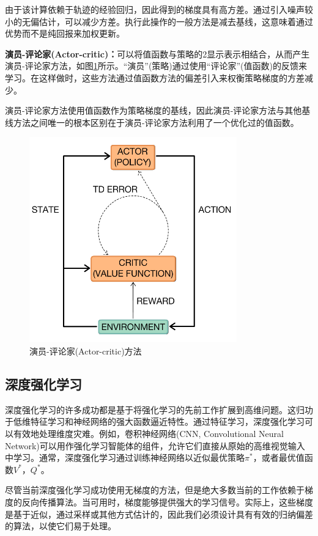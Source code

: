 由于该计算依赖于轨迹的经验回归，因此得到的梯度具有高方差。通过引入噪声较小的无偏估计，可以减少方差。执行此操作的一般方法是减去基线，这意味着通过优势而不是纯回报来加权更新。

\textbf{演员-评论家(Actor-critic)：}可以将值函数与策略的2显示表示相结合，从而产生演员-评论家方法，如图\ref{ac}所示。“演员”(策略)通过使用“评论家”(值函数)的反馈来学习。在这样做时，这些方法通过值函数方法的偏差引入来权衡策略梯度的方差减少\cite{23}\cite{24}。

演员-评论家方法使用值函数作为策略梯度的基线，因此演员-评论家方法与其他基线方法之间唯一的根本区别在于演员-评论家方法利用了一个优化过的值函数。
\begin{figure}[htb]
  \centering
  \includegraphics[width=0.80\textwidth]{figures/ac.png}
  \caption{演员-评论家(Actor-critic)方法}\label{ac}
\end{figure}

\subsection{深度强化学习}
深度强化学习的许多成功都是基于将强化学习的先前工作扩展到高维问题。这归功于低维特征学习和神经网络的强大函数逼近特性。通过特征学习，深度强化学习可以有效地处理维度灾难。例如，卷积神经网络(CNN, Convolutional Neural Network)可以用作强化学习智能体的组件，允许它们直接从原始的高维视觉输入中学习。通常，深度强化学习通过训练神经网络以近似最优策略$\pi^*$，或者最优值函数$V^*$，$Q^*$。

尽管当前深度强化学习成功使用无梯度的方法，但是绝大多数当前的工作依赖于梯度的反向传播算法。当可用时，梯度能够提供强大的学习信号。实际上，这些梯度是基于近似，通过采样或其他方式估计的，因此我们必须设计具有有效的归纳偏差的算法，以使它们易于处理。


